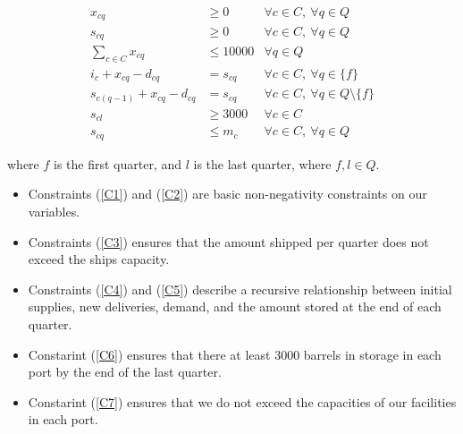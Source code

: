 \documentclass[a4paper]{article}
\begin{document}
\begin{align}
x_{cq} & \geq 0 & \forall c \in C,\  \forall q \in Q \label{C1}\\
s_{cq} & \geq 0 & \forall c \in C,\  \forall q \in Q \label{C2}\\
\sum_{c \in C} x_{cq} & \leq 10000 & \forall q \in Q \label{C3}\\
i_{c} +  x_{cq} - d_{cq} & = s_{cq} & \forall c \in C,\  \forall q \in \{ f \} \label{C4}\\
s_{c(q - 1)} +  x_{cq} - d_{cq} & = s_{cq} & \forall c \in C,\  \forall q \in Q \setminus \{ f \} \label{C5}\\
s_{cl} & \geq 3000 & \forall c \in C \label{C6}\\
s_{cq} & \leq m_c & \forall c \in C,\  \forall q \in Q \label{C7}
\end{align}

where $f$ is the first quarter, and $l$ is the last quarter, where $f, l \in Q$.
\begin{itemize}
    \item Constraints (\ref{C1}) and (\ref{C2}) are basic non-negativity constraints on our variables. 
    \item Constraints (\ref{C3}) ensures that the amount shipped per quarter does not exceed the ships capacity.
    \item Constraints (\ref{C4}) and (\ref{C5}) describe a recursive relationship between initial supplies, new deliveries, demand, and the amount stored at the end of each quarter.
    \item Constarint (\ref{C6}) ensures that there at least 3000 barrels in storage in each port by the end of the last quarter.
    \item Constarint (\ref{C7}) ensures that we do not exceed the capacities of our facilities in each port.
\end{itemize}
\end{document}
